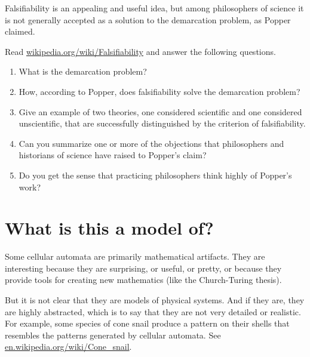 \documentclass[10pt]{book}
\begin{document}
\begin{ex}

Falsifiability is an appealing and useful idea, but among
philosophers of science it is not generally accepted 
as a solution to the demarcation problem, as Popper claimed.

Read \url{wikipedia.org/wiki/Falsifiability} and answer the following
questions.

\begin{enumerate}

\item What is the demarcation problem?

\item How, according to Popper, does falsifiability solve the
demarcation problem?

\item Give an example of two theories, one considered scientific
and one considered unscientific, that are successfully distinguished
by the criterion of falsifiability.

\item Can you summarize one or more of the objections that 
philosophers and historians of science have raised to Popper's
claim?

\item Do you get the sense that practicing philosophers think
highly of Popper's work?

\end{enumerate}

\end{ex}



\section{What is this a model of?}

Some cellular automata are primarily mathematical artifacts.
They are interesting because they are surprising, 
or useful, or pretty, or because they provide tools for
creating new mathematics (like the Church-Turing thesis).

But it is not clear that they are models of physical systems.  And if
they are, they are highly abstracted, which is to say that they are
not very detailed or realistic.  For example, some species of cone
snail produce a
pattern on their shells that resembles the patterns generated by
cellular automata.  See \url{en.wikipedia.org/wiki/Cone_snail}.
\end{document}

